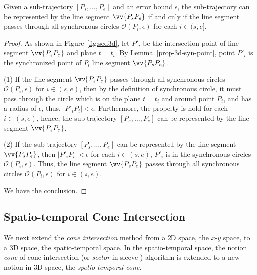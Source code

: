 \begin{theorem}
\label{prop-3d-sed-sim}
Given a sub-trajectory $[P_s, \ldots, P_e]$ and an error bound $\epsilon$, the sub-trajectory can be represented by the line segment $\vv{P_sP_e}$ if and only if the line segment passes through all synchronous circles $\mathcal{O}(P_i, \epsilon)$ for each $i \in (s, e]$.
\end{theorem}

\begin{proof}
As shown in Figure~\ref{fig:sed3d}, let $P'_i$ be the intersection point of line segment $\vv{P_sP_e}$ and plane $t=t_i$.
By Lemma~\ref{prop-3d-syn-point}, point $P'_i$ is the synchronized point of $P_i$ \wrt line segment $\vv{P_sP_e}$.

\ni (1) If the line segment $\vv{P_sP_e}$ passes through all synchronous circles $\mathcal{O}(P_i, \epsilon)$ for $i \in (s, e)$, then by the definition of synchronous circle, it must pass through the circle which is on the plane $t=t_i$ and around point $P_i$, and has a radius of $\epsilon$, thus, $|P'_iP_i| <\epsilon$. Furthermore, the property is hold for each $i \in (s, e)$, hence, the sub trajectory $[P_s, \ldots, P_e]$ can be represented by the line segment $\vv{P_sP_e}$.

\ni (2) If the sub trajectory $[P_s, \ldots, P_e]$ can be represented by the line segment $\vv{P_sP_e}$, then $|P'_iP_i| <\epsilon$ for each $i \in (s, e)$, \ie $P'_i$ is in the synchronous circles $\mathcal{O}(P_i, \epsilon)$. Thus, the line segment $\vv{P_sP_e}$ passes through all synchronous circles $\mathcal{O}(P_i, \epsilon)$ for $i \in (s, e)$.

We have the conclusion.
\end{proof}







\subsection{Spatio-temporal Cone Intersection}

We next extend the \emph{cone intersection} method \cite{Williams:Longest, Sklansky:Cone, Zhao:Sleeve} from a 2D space, \ie the $x$-$y$ space, to a 3D space, \ie the spatio-temporal space.
In the spatio-temporal space, the notion \emph{cone} of cone intersection \cite{Williams:Longest, Sklansky:Cone} (or \emph{sector} in sleeve \cite{Zhao:Sleeve}) algorithm is extended to a new notion in 3D space, \ie the \emph{spatio-temporal cone}.

